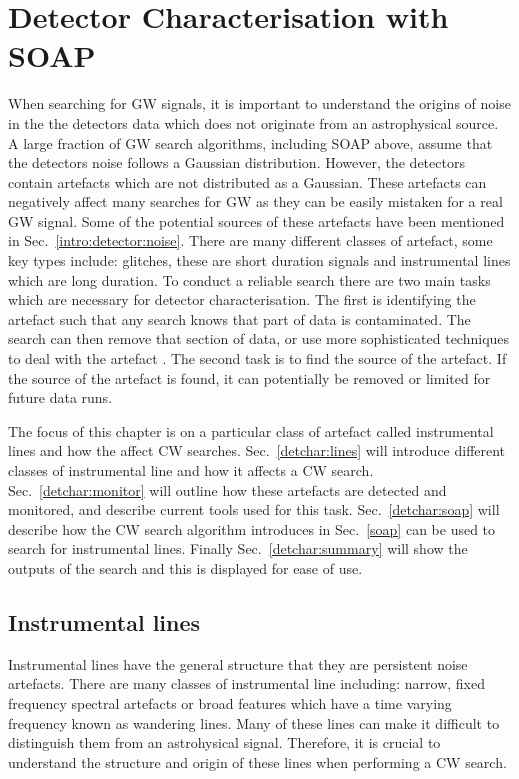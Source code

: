 \chapter{\label{detchar}Detector Characterisation with SOAP}

When searching for \ac{GW} signals, it is important to understand the origins of noise in the the detectors data which does not originate from an astrophysical source.
A large fraction of \ac{GW} search algorithms, including SOAP above, assume that the detectors noise follows a Gaussian distribution.
However, the detectors contain artefacts which are not distributed as a Gaussian. 
These artefacts can negatively affect many searches for \ac{GW} as they can be easily mistaken for a real \ac{GW} signal.
Some of the potential sources of these artefacts have been mentioned in Sec.~\ref{intro:detector:noise}. 
There are many different classes of artefact, some key types include: glitches, these are short duration signals and instrumental lines which are long duration.
To conduct a reliable search there are two main tasks which are necessary for detector characterisation.
The first is identifying the artefact such that any search knows that part of data is contaminated.
The search can then remove that section of data, or use more sophisticated techniques to deal with the artefact \citep{}.
The second task is to find the source of the artefact. 
If the source of the artefact is found, it can potentially be removed or limited for future data runs.

The focus of this chapter is on a particular class of artefact called instrumental lines and how the affect \ac{CW} searches.
Sec.~\ref{detchar:lines} will introduce different classes of instrumental line and how it affects a \ac{CW} search.
Sec.~\ref{detchar:monitor} will outline how these artefacts are detected and monitored, and describe current tools used for this task.
Sec.~\ref{detchar:soap} will describe how the \ac{CW} search algorithm introduces in Sec.~\ref{soap} can be used to search for instrumental lines.
Finally Sec.~\ref{detchar:summary} will show the outputs of the search and this is displayed for ease of use.



\section{\label{detchar:lines}Instrumental lines}

Instrumental lines have the general structure that they are persistent noise artefacts.
There are many classes of instrumental line including: narrow, fixed frequency spectral artefacts or broad features which have a time varying frequency known as wandering lines.
Many of these lines can make it difficult to distinguish them from an astrohysical signal.
Therefore, it is crucial to understand the structure and origin of these lines when performing a \ac{CW} search.

